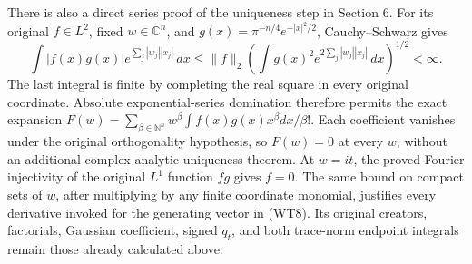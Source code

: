 \documentclass[
  11pt,
]{article}
\begin{document}
There is also a direct series proof of the uniqueness step in Section 6.
For its original \(f\in L^2\), fixed \(w\in\mathbb C^n\), and
\(g(x)=\pi^{-n/4}e^{-|x|^2/2}\), Cauchy--Schwarz gives \[
 \int |f(x)g(x)|e^{\sum_j|w_j||x_j|}\,dx
 \leq\|f\|_2
       \left(\int g(x)^2e^{2\sum_j|w_j||x_j|}\,dx\right)^{1/2}
 <\infty.                                                       \tag{TO2}
\] The last integral is finite by completing the real square in every
original coordinate. Absolute exponential-series domination therefore
permits the exact expansion
\(F(w)=\sum_{\beta\in\mathbb N^n}w^\beta\int f(x)g(x)x^\beta dx/\beta!\).
Each coefficient vanishes under the original orthogonality hypothesis,
so \(F(w)=0\) at every \(w\), without an additional complex-analytic
uniqueness theorem. At \(w=it\), the proved Fourier injectivity of the
original \(L^1\) function \(fg\) gives \(f=0\). The same bound on
compact sets of \(w\), after multiplying by any finite coordinate
monomial, justifies every derivative invoked for the generating vector
in (WT8). Its original creators, factorials, Gaussian coefficient,
signed \(q_t\), and both trace-norm endpoint integrals remain those
already calculated above.
\end{document}
